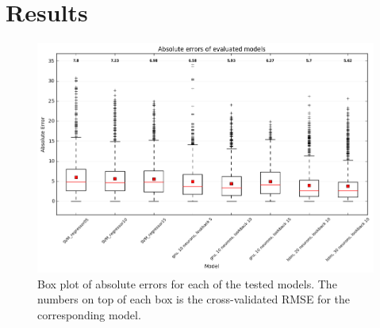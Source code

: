     \section{Results}

    \begin{figure}[H]
        \centering
        \includegraphics[width=\linewidth]{../images/plot_box_error_models.png}
        \caption{Box plot of absolute errors for each of the tested models. The numbers on top of each box is the cross-validated RMSE for the corresponding model.} \label{fig:box_error}
    \end{figure}
